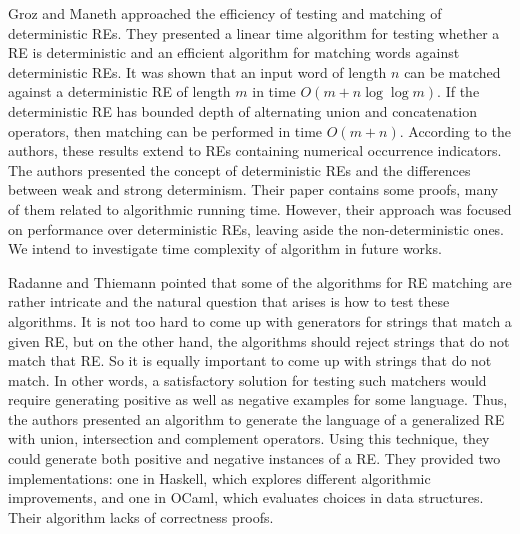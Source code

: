 \documentclass[oneside,12pt]{scrbook}
\theoremstyle{definition}
\theoremstyle{plain}
\theoremstyle{definition}
\begin{document}
Groz and Maneth \cite{Groz2017} approached the efficiency of testing and matching of deterministic REs. They presented a linear time algorithm for testing whether a RE is deterministic and an efficient algorithm for matching words against deterministic REs. It was shown that an input word of length $n$ can be matched against a deterministic RE of length $m$ in time $O (m + n  \log \log m)$. If the deterministic RE has bounded depth of alternating union and concatenation operators, then matching can be performed in time $O (m + n)$. According to the authors, these results extend to REs containing numerical occurrence indicators. The authors presented the concept of deterministic REs and the differences between weak and strong determinism. Their paper contains some proofs, many of them related to algorithmic running time. However, their approach was focused on performance over deterministic REs, leaving aside the non-deterministic ones. We intend to investigate time complexity of algorithm in future works.

Radanne and Thiemann \cite{radanne:hal-01788827} pointed that some of the algorithms for RE matching are rather intricate and the natural question that arises is how to test these algorithms. It is not too hard to come up with generators for strings that match a given RE, but on the other hand, the algorithms should reject strings that do not match that RE. So it is equally important to come up with strings that do not match. In other words, a satisfactory solution for testing such matchers would require generating positive as well as negative examples for some language. Thus, the authors presented an algorithm to generate the language of a generalized RE with union, intersection and complement operators. Using this technique, they could generate both positive and negative instances of a RE. They provided two implementations: one in Haskell, which explores different algorithmic improvements, and one in OCaml, which evaluates choices in data structures. Their algorithm lacks of correctness proofs.


\end{document}
